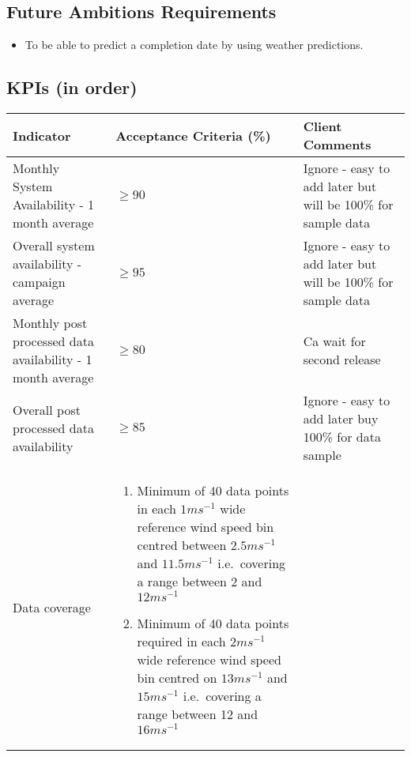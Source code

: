 \documentclass{article}
\begin{document}
\begin{multicols}{2}
    \subsection{Future Ambitions Requirements}
    \begin{itemize}
        \item To be able to predict a completion date by using weather predictions.
    \end{itemize}
    \subsection{KPIs (in order)}
    \begin{tabularx}{\linewidth}{XXX}
        Indicator & Acceptance Criteria (\%) & Client Comments \\
        \toprule
        Monthly System Availability - 1 month average & $\geq 90$ & Ignore - easy to add later but will be 100\% for sample data \\
        Overall system availability - campaign average & $\geq 95$ & Ignore - easy to add later but will be 100\% for sample data \\
        Monthly post processed data availability - 1 month average & $\geq 80$ & Ca wait for second release \\
        Overall post processed data availability & $ \geq 85$ & Ignore - easy to add later buy 100\% for data sample \\
        Data coverage & 
        \begin{enumerate}
            \item Minimum of 40 data points in each $1ms^{-1}$ wide reference wind speed bin centred between $2.5ms^{-1}$ and $11.5ms^{-1}$ i.e.\ covering a range between 2 and $12ms^{-1}$
            \item Minimum of 40 data points required in each $2ms^{-1}$ wide reference wind speed bin centred on $13ms^{-1}$ and $15ms^{-1}$ i.e.\ covering a range between 12 and $16ms^{-1}$
        \end{enumerate}
    \end{tabularx}
    \vfill\null\columnbreak{}
    \vfill\null{}
\end{multicols}
\end{document}
